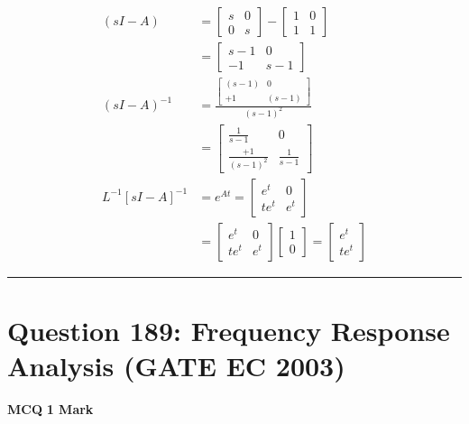 \documentclass[11pt,a4paper]{article}
\begin{document}
\begin{tcolorbox}[solbox, title=Detailed Solution -- Question 188]
\[
\begin{aligned} (s I-A) &=\left[\begin{array}{ll} s & 0 \\ 0 & s \end{array}\right]-\left[\begin{array}{ll} 1 & 0 \\ 1 & 1 \end{array}\right] \\ &=\left[\begin{array}{cc} s-1 & 0 \\ -1 & s-1 \end{array}\right] \\ (s I-A)^{-1} &=\frac{\left[\begin{array}{cc} (s-1) & 0 \\ +1 & (s-1) \end{array}\right]}{(s-1)^{2}}\\ &=\left[\begin{array}{cc}\frac{1}{s-1} & 0 \\ \frac{+1}{(s-1)^{2}} & \frac{1}{s-1}\end{array}\right] \\ L^{-1}[s I-A]^{-1}&=e^{A t}=\left[\begin{array}{cc}e^{t} & 0 \\ t e^{t} & e^{t}\end{array}\right] \\ &=\left[\begin{array}{cc}e^{t} & 0 \\ t e^{t} & e^{t}\end{array}\right]\left[\begin{array}{l}1 \\ 0\end{array}\right]=\left[\begin{array}{c}e^{t} \\ t e^{t}\end{array}\right] \end{aligned}
\]
\end{tcolorbox}

\vspace{1.5em}
\hrule
\vspace{1.5em}

\section*{Question 189: Frequency Response Analysis (GATE EC 2003)}
\noindent \textbf{\color{primary}MCQ} \hfill \textbf{\color{secondary}1 Mark}
\end{document}
